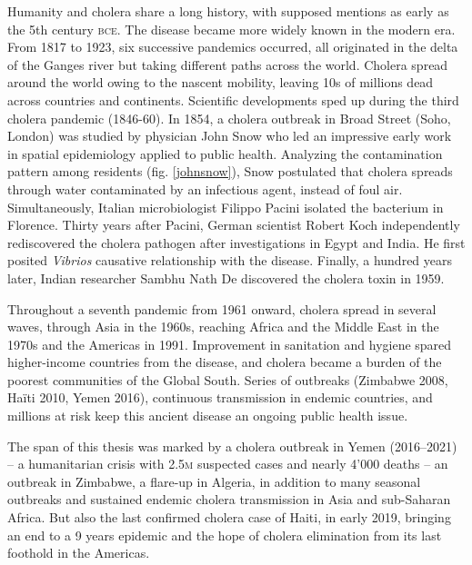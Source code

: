Humanity and cholera share a long history, with supposed mentions as early as the 5th century \textsc{bce}. The disease became more widely known in the modern era. From 1817 to 1923, six successive pandemics occurred, all originated in the delta of the Ganges river but taking different paths across the world. Cholera spread around the world owing to the nascent mobility, leaving 10s of millions dead across countries and continents.  Scientific developments sped up during the third cholera pandemic (1846-60). In 1854, a cholera outbreak in Broad Street (Soho, London) was studied by physician John Snow who led an impressive early work in spatial epidemiology applied to public health. Analyzing the contamination pattern among residents (fig. \ref{johnsnow}), Snow postulated that cholera spreads through water contaminated by an infectious agent, instead of foul air.  Simultaneously, Italian microbiologist Filippo Pacini isolated the bacterium in Florence\cite{Pacini:OsservazioniMicroscopicheDeduzioni:1854}. Thirty years after Pacini, German scientist Robert Koch independently rediscovered the cholera pathogen after investigations in Egypt and India. He first posited \textit{Vibrios} causative relationship with the disease. Finally, a hundred years later, Indian researcher Sambhu Nath De discovered the cholera toxin in 1959\cite{De:ExperimentalStudyAction:1951}.

Throughout a seventh pandemic from 1961 onward, cholera spread in several waves, through Asia in the 1960s, reaching Africa and the Middle East in the 1970s and the Americas in 1991\cite{Mutreja:EvidenceSeveralWaves:2011}. Improvement in sanitation and hygiene spared higher-income countries from the disease, and cholera became a burden of the poorest communities of the Global South. Series of outbreaks (\eg Zimbabwe 2008, Haïti 2010, Yemen 2016), continuous transmission in endemic countries, and millions at risk keep this ancient disease an ongoing public health issue.

The span of this thesis was marked by a cholera outbreak in Yemen (2016--2021) -- a humanitarian crisis with 2.5\textsc{m} suspected cases and nearly 4'000 deaths -- an outbreak in Zimbabwe, a flare-up in Algeria, in addition to many seasonal outbreaks and sustained endemic cholera transmission in Asia and sub-Saharan Africa. But also the last confirmed cholera case of Haiti, in early 2019, bringing an end to a 9 years epidemic and the hope of cholera elimination from its last foothold in the Americas. 

